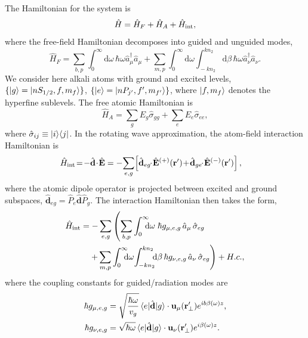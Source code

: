 \documentclass[aps,pra,twocolumn]{revtex4-1} %
\newcommand{\inter}{{\rm int}}
\begin{document}
The Hamiltonian for the system is
\begin{equation}
\hat{H} = \hat{H}_F+\hat{H}_A + \hat{H}_{\inter},
\end{equation}
where the free-field Hamiltonian decomposes into guided and unguided modes, 
	\begin{equation}
		\hat{H}_F = \!\sum_{b,p}\!\! \int_0^{\infty}\!\!\! \mathrm{d}\omega \, \hbar \omega \hat{a}^\dagger_\mu \hat{a}_\mu 
\!+\!\sum_{m,p}\! \int_0^{\infty}\!\!\! \mathrm{d}\omega\!\!\!  \int_{\!-k n_2}^{k n_2}\!\!\! \mathrm{d}\beta \, \hbar \omega 
\hat{a}^\dagger_\nu \hat{a}_\nu.
	\end{equation}
We consider here alkali atoms with ground and excited levels, $\{ \lvert{g}\rangle=\lvert{nS_{1/2}, f, m_f}\rangle\}$, $\{ \lvert{e}\rangle =\lvert{nP_{j'}, f', m_{f'}}\rangle\}$, where $\lvert{f, m_f}\rangle$ denotes the hyperfine sublevels.  The free atomic Hamiltonian is
	\begin{equation}
		\hat{H}_A  = \sum_g E_g \hat{\sigma}_{gg} + \sum_e E_e \hat{\sigma}_{ee},
	\end{equation}
where $\hat{\sigma}_{ij} \equiv \lvert{i}\rangle\langle{j}\rvert$.  In the rotating wave approximation, the atom-field interaction Hamiltonian is
	\begin{align}
		\hat{H}_{\inter} &\!=\! -\hat{\mathbf{d}}\!\cdot\! \hat{\mathbf{E}} =- \!\sum_{e,g}\! \left[ \hat{\mathbf{d}}_{eg}\!\!\cdot\! 
\hat{\mathbf{E}}^{(+)}(\br') \!+\! \hat{\mathbf{d}}_{ge}\!\!\cdot\! \hat{\mathbf{E}}^{(-)}(\br') \right],
	\end{align}
where the atomic dipole operator is projected between excited and ground subspaces, $\hat{\mathbf{d}}_{eg}= \hat{P}_e \hat{\mathbf{d}} \hat{P}_g $. The interaction Hamiltonian then takes the form, 
\begin{align}
	\hat{H}_{\inter} &= -\sum_{e,g} \left(\sum_{b,p} \int_0^{\infty}\!\!\!\!\mathrm{d}\omega \; \hbar g_{\mu, e,g}\, \hat{a}_\mu  \, 
		\hat{\sigma}_{eg}\right.\nonumber\\
	&\quad \left. + \sum_{m,p} \int_0^{\infty}\!\!\!\!\mathrm{d}\omega \! \int_{-kn_2}^{kn_2}\!\!\!\mathrm{d}\beta \,  \hbar 
g_{\nu, e,g}\, \hat{a}_\nu \, \hat{\sigma}_{eg}\right) + {H.c.},
	\end{align}
where the coupling constants for guided/radiation modes are
\begin{subequations} \label{Eq::CouplingConstants}
	\begin{align}
		\hbar g_{\mu, e,g} &= \sqrt{\frac{\hbar \omega}{ v_g  }}\, \langle{e}\rvert \hat{\mathbf{d}} \lvert{g}\rangle 
\cdot\mathbf{u}_\mu ( \mathbf{r}'_\perp ) e^{i b \beta(\omega)z} , \\
		\hbar g_{\nu, e,g} &= \sqrt{  \hbar \omega } \, \langle{e}\rvert \hat{\mathbf{d}} \lvert{g}\rangle \cdot \mathbf{u}_\nu ( \mathbf{r}'_\perp) e^{i\beta(\omega)z}  .
	\end{align}
\end{subequations}
\end{document}
